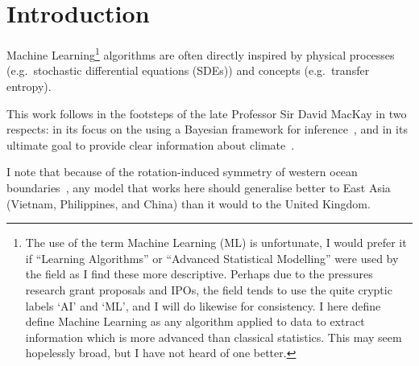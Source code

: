 \section{Introduction}
\label{sec:1_Introduction}

Machine Learning\footnote{The use of the term Machine Learning (ML) is unfortunate,
I would prefer it if ``Learning Algorithms'' or ``Advanced Statistical Modelling''
 were used by the field as I find these more descriptive.
  Perhaps due to the pressures research grant proposals and IPOs,
   the field tends to use the quite cryptic labels `AI' and `ML',
   and I will do likewise for consistency.
   I here define define Machine Learning as any algorithm applied to data
    to extract information which is more advanced than classical statistics.
    This may seem hopelessly broad, but I have not heard of one better. }
algorithms are often directly inspired by physical processes (e.g.\
stochastic differential equations (SDEs)) and concepts (e.g.\ transfer entropy).


This work follows in the footsteps of the late Professor Sir David MacKay
in two respects: in its focus on the using a Bayesian framework for inference~\cite{ITILA, MacKay91},
and in its ultimate goal to provide clear information about climate~\cite{mackay2008sustainable}.

I note that because of the rotation-induced symmetry of western ocean boundaries~\cite{hogg1995western},
 any model that works here should generalise better to East Asia (Vietnam, Philippines,
  and China) than it would to the United Kingdom.

